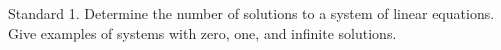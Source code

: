 Standard 1.	Determine the number of solutions to a system of linear equations. Give examples of systems with zero, one, and infinite solutions.

\ifprintanswers
\else %
 \newpage
\fi

\begin{solution}
   
\end{solution}